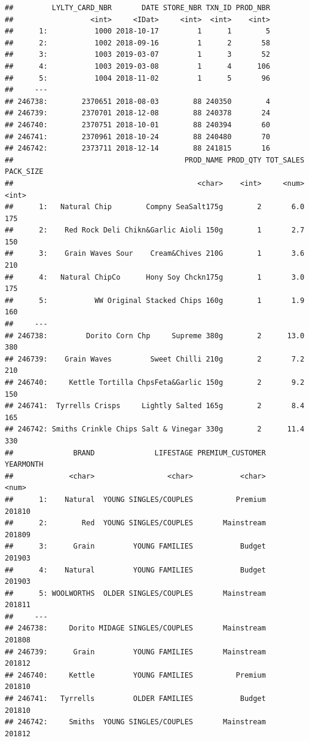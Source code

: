\documentclass[
]{article}
\begin{document}
\begin{verbatim}
##         LYLTY_CARD_NBR       DATE STORE_NBR TXN_ID PROD_NBR
##                  <int>     <IDat>     <int>  <int>    <int>
##      1:           1000 2018-10-17         1      1        5
##      2:           1002 2018-09-16         1      2       58
##      3:           1003 2019-03-07         1      3       52
##      4:           1003 2019-03-08         1      4      106
##      5:           1004 2018-11-02         1      5       96
##     ---                                                    
## 246738:        2370651 2018-08-03        88 240350        4
## 246739:        2370701 2018-12-08        88 240378       24
## 246740:        2370751 2018-10-01        88 240394       60
## 246741:        2370961 2018-10-24        88 240480       70
## 246742:        2373711 2018-12-14        88 241815       16
##                                        PROD_NAME PROD_QTY TOT_SALES PACK_SIZE
##                                           <char>    <int>     <num>     <int>
##      1:   Natural Chip        Compny SeaSalt175g        2       6.0       175
##      2:    Red Rock Deli Chikn&Garlic Aioli 150g        1       2.7       150
##      3:    Grain Waves Sour    Cream&Chives 210G        1       3.6       210
##      4:   Natural ChipCo      Hony Soy Chckn175g        1       3.0       175
##      5:           WW Original Stacked Chips 160g        1       1.9       160
##     ---                                                                      
## 246738:         Dorito Corn Chp     Supreme 380g        2      13.0       380
## 246739:    Grain Waves         Sweet Chilli 210g        2       7.2       210
## 246740:     Kettle Tortilla ChpsFeta&Garlic 150g        2       9.2       150
## 246741:  Tyrrells Crisps     Lightly Salted 165g        2       8.4       165
## 246742: Smiths Crinkle Chips Salt & Vinegar 330g        2      11.4       330
##              BRAND              LIFESTAGE PREMIUM_CUSTOMER YEARMONTH
##             <char>                 <char>           <char>     <num>
##      1:    Natural  YOUNG SINGLES/COUPLES          Premium    201810
##      2:        Red  YOUNG SINGLES/COUPLES       Mainstream    201809
##      3:      Grain         YOUNG FAMILIES           Budget    201903
##      4:    Natural         YOUNG FAMILIES           Budget    201903
##      5: WOOLWORTHS  OLDER SINGLES/COUPLES       Mainstream    201811
##     ---                                                             
## 246738:     Dorito MIDAGE SINGLES/COUPLES       Mainstream    201808
## 246739:      Grain         YOUNG FAMILIES       Mainstream    201812
## 246740:     Kettle         YOUNG FAMILIES          Premium    201810
## 246741:   Tyrrells         OLDER FAMILIES           Budget    201810
## 246742:     Smiths  YOUNG SINGLES/COUPLES       Mainstream    201812
\end{verbatim}
\end{document}
